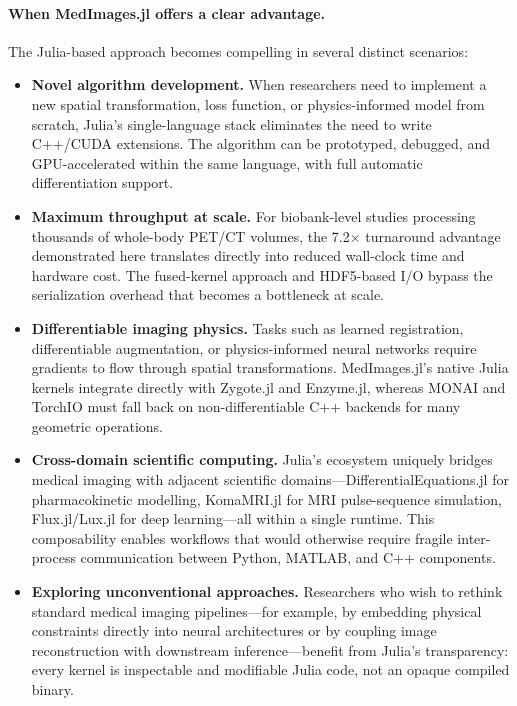 \documentclass[10pt,letterpaper]{article}
\begin{document}
\paragraph{When MedImages.jl offers a clear advantage.}
The Julia-based approach becomes compelling in several distinct scenarios:
\begin{itemize}
    \item \textbf{Novel algorithm development.} When researchers need to implement a new spatial transformation, loss function, or physics-informed model from scratch, Julia's single-language stack eliminates the need to write C++/CUDA extensions. The algorithm can be prototyped, debugged, and GPU-accelerated within the same language, with full automatic differentiation support.
    \item \textbf{Maximum throughput at scale.} For biobank-level studies processing thousands of whole-body PET/CT volumes, the 7.2$\times$ turnaround advantage demonstrated here translates directly into reduced wall-clock time and hardware cost. The fused-kernel approach and HDF5-based I/O bypass the serialization overhead that becomes a bottleneck at scale.
    \item \textbf{Differentiable imaging physics.} Tasks such as learned registration, differentiable augmentation, or physics-informed neural networks require gradients to flow through spatial transformations. MedImages.jl's native Julia kernels integrate directly with Zygote.jl and Enzyme.jl, whereas MONAI and TorchIO must fall back on non-differentiable C++ backends for many geometric operations.
    \item \textbf{Cross-domain scientific computing.} Julia's ecosystem uniquely bridges medical imaging with adjacent scientific domains---DifferentialEquations.jl for pharmacokinetic modelling, KomaMRI.jl \cite{CastilloPassiCoronado2023} for MRI pulse-sequence simulation, Flux.jl/Lux.jl \cite{pal2023lux} for deep learning---all within a single runtime. This composability enables workflows that would otherwise require fragile inter-process communication between Python, MATLAB, and C++ components.
    \item \textbf{Exploring unconventional approaches.} Researchers who wish to rethink standard medical imaging pipelines---for example, by embedding physical constraints directly into neural architectures or by coupling image reconstruction with downstream inference---benefit from Julia's transparency: every kernel is inspectable and modifiable Julia code, not an opaque compiled binary.
\end{itemize}
\end{document}

